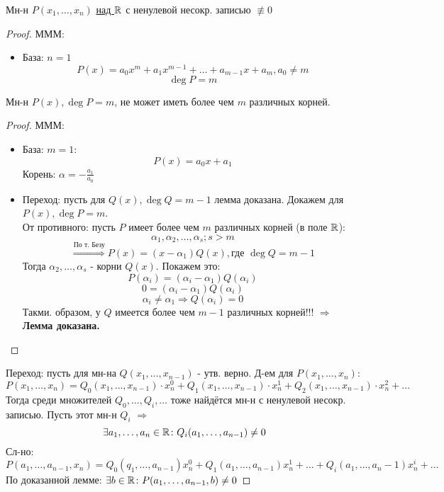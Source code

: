 \begin{statement}
  \label{state:nesokr_poly}
Мн-н $P(x_1, \ldots, x_n)$ \underline{над $\mathbb{R}$} с ненулевой несокр. записью $\not\equiv 0$
\end{statement}
\begin{proof}
МММ: \\
\begin{itemize}
  \item База: $n = 1$
    \[
    P(x) = a_0 x^{m} + a_1 x^{m - 1} + \ldots + a_{m - 1}x + a_m, a_0 \neq m
    \]
    \[
    \deg P = m
    \]
\end{itemize}
\begin{lemma}
Мн-н $P(x), \deg P = m$, не может иметь более чем $m$ различных корней.
\end{lemma}
\begin{proof}
МММ:
\begin{itemize}
  \item База: $m = 1$:
    \[
    P(x) = a_0x + a_1 
    \]
    Корень: $\alpha = -\frac{a_1}{a_0}$
  \item Переход: пусть для $Q(x), \deg Q = m - 1$ лемма доказана. Докажем для $P(x), \deg P = m$. \\
    От противного: пусть $P$ имеет более чем $m$ различных корней (в поле $\mathbb{R}$):
    \[
    \alpha_1, \alpha_2, \ldots, \alpha_s; s > m
    \]
    \[
    \overset{\text{По т. Безу}}{\Rightarrow} P(x) = (x - \alpha_1)Q(x), \text{где } \deg Q = m - 1
    \]
    Тогда $\alpha_2, \ldots, \alpha_s$ - корни $Q(x)$. Покажем это:
    \[
    P(\alpha_i) = (\alpha_i - \alpha_1)Q(\alpha_i)
    \]
    \[
    0 = (\alpha_i - \alpha_1)Q(\alpha_i)
    \]
    \[
    \alpha_i \neq \alpha_1 \Rightarrow Q(\alpha_i) = 0
    \]
    Такми. образом, у $Q$ имеется более чем $m - 1$ различных корней!!! $\Rightarrow$ \textbf{Лемма доказана.}
\end{itemize}
\end{proof}
\item Переход: пусть для мн-на $Q(x_1, \ldots, x_{n - 1})$ - утв. верно. Д-ем для $P(x_1, \ldots, x_n)$:
  \[
  P(x_1, \ldots, x_n) = Q_0(x_1, \ldots, x_{n - 1}) \cdot x_n ^{0}  + Q_1(x_1, \ldots, x_{n - 1}) \cdot x_n^{1} + Q_2(x_1, \ldots, x_{n - 1}) \cdot x_n^{2} + \ldots
  \]
  Тогда среди множителей $Q_0, \ldots, Q_i, \ldots$ тоже найдётся мн-н с ненулевой несокр. записью. Пусть этот мн-н $Q_i$ $\Rightarrow$
  \[
    \exists a_1, \ldots, a_n \in \mathbb{R} \colon Q_i(a_1, \ldots, a_{n - 1}) \neq 0
  \]
Сл-но: 
\[
  P(a_1, \ldots, a_{n - 1}, x_n) = Q_0(q_1, \ldots, a_{n - 1}) x_n^{0} + Q_1(a_1, \ldots, a_{n - 1})x_n^{1} + \ldots + Q_i(a_1, \ldots, a_n - 1)x_n^{i} + \ldots
\]
По доказанной лемме: $\exists b \in \mathbb{R} \colon P(a_1, \ldots, a_{n - 1}, b) \neq 0$
\end{proof}

